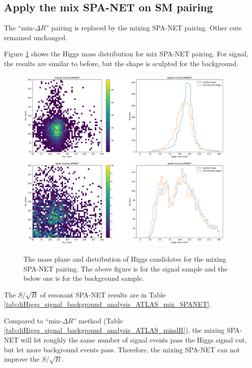 \documentclass[12pt]{article}
\begin{document}

	\subsection{Apply the mix SPA-NET on SM pairing}%
	\label{sub:apply_the_mix_spa_net_on_sm_pairing}
		The ``$ \text{min-}\Delta R$'' pairing is replaced by the mixing SPA-NET pairing. Other cuts remained unchanged. 

		Figure \ref{fig:Higgs_mass_new_mix_SPANET} shows the Higgs mass distribution for mix SPA-NET pairing. For signal, the results are similar to before, but the shape is sculpted for the background.
		\begin{figure}[htpb]
			\centering
			\includegraphics[width=0.97\textwidth]{Higgs_mass_new_mix-SPANET_s.png}
			\includegraphics[width=0.97\textwidth]{Higgs_mass_new_mix-SPANET_4b.png}
			\caption{The mass plane and distribution of Higgs candidates for the mixing SPA-NET pairing. The above figure is for the signal sample and the below one is for the background sample.}
			\label{fig:Higgs_mass_new_mix_SPANET}
		\end{figure}

		The $S / \sqrt{B}$ of resonant SPA-NET results are in Table \ref{tab:diHiggs_signal_background_analysis_ATLAS_mix_SPANET}.

		Compared to ``$\text{min-}\Delta R$'' method (Table \ref{tab:diHiggs_signal_background_analysis_ATLAS_mindR}), the mixing SPA-NET will let roughly the same number of signal events pass the Higgs signal cut, but let more background events pass. Therefore, the mixing SPA-NET can not improve the $S/\sqrt{B}$.
\end{document}
